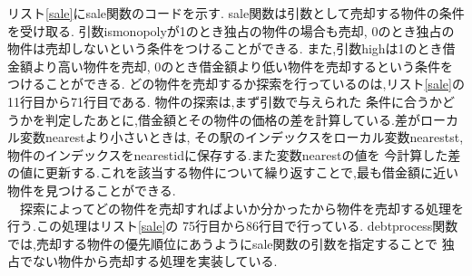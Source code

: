 \documentclass[a4j]{jarticle}
\begin{document}
        リスト\ref{sale}にsale関数のコードを示す. sale関数は引数として売却する物件の条件を受け取る.
        引数ismonopolyが1のとき独占の物件の場合も売却, 0のとき独占の物件は売却しないという条件をつけることができる.
        また,引数highは1のとき借金額より高い物件を売却, 0のとき借金額より低い物件を売却するという条件をつけることができる.
        どの物件を売却するか探索を行っているのは,リスト\ref{sale}の11行目から71行目である. 物件の探索は,まず引数で与えられた
        条件に合うかどうかを判定したあとに,借金額とその物件の価格の差を計算している.差がローカル変数nearestより小さいときは,
        その駅のインデックスをローカル変数nearestst,物件のインデックスをnearestidに保存する.また変数nearestの値を
        今計算した差の値に更新する.これを該当する物件について繰り返すことで,最も借金額に近い物件を見つけることができる.\\
        　探索によってどの物件を売却すればよいか分かったから物件を売却する処理を行う.この処理はリスト\ref{sale}の
        75行目から86行目で行っている. debtprocess関数では,売却する物件の優先順位にあうようにsale関数の引数を指定することで
        独占でない物件から売却する処理を実装している.
\end{document}
